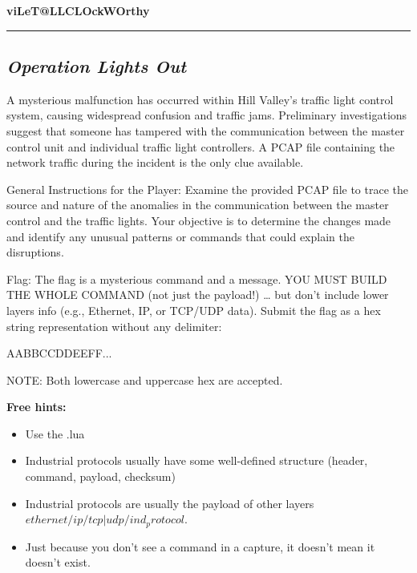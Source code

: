 \documentclass{article}
\begin{document}
\begin{center}
    \textbf{viLeT@LLCLOckWOrthy}
\end{center}

\noindent\rule{\textwidth}{0.4pt}

\subsection{\textit{Operation Lights Out}}
\begin{tcolorbox}[
    colback=gray!5,  %
    colframe=gray!75,  %
    title=\textbf{Zadatak}]
    A mysterious malfunction has occurred within Hill Valley's traffic light control system, causing widespread confusion and traffic jams. Preliminary investigations suggest that someone has tampered with the communication between the master control unit and individual traffic light controllers. A PCAP file containing the network traffic during the incident is the only clue available.

    General Instructions for the Player: Examine the provided PCAP file to trace the source and nature of the anomalies in the communication between the master control and the traffic lights. Your objective is to determine the changes made and identify any unusual patterns or commands that could explain the disruptions.

    Flag: The flag is a mysterious command and a message. YOU MUST BUILD THE WHOLE COMMAND (not just the payload!) … but don’t include lower layers info (e.g., Ethernet, IP, or TCP/UDP data). Submit the flag as a hex string representation without any delimiter:

    AABBCCDDEEFF...

    NOTE: Both lowercase and uppercase hex are accepted.

    \textbf{Free hints:}
    \begin{itemize}
        \item Use the .lua
        \item Industrial protocols usually have some well-defined structure (header, command, payload, checksum)
        \item Industrial protocols are usually the payload of other layers \(ethernet/ip/tcp|udp/ind_protocol\).
        \item Just because you don't see a command in a capture, it doesn't mean it doesn't exist.
    \end{itemize}
\end{tcolorbox}
\end{document}
